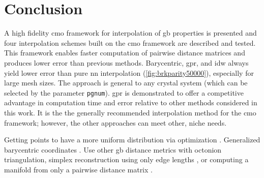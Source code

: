 \documentclass[preprint,12pt]{elsarticle}
\begin{document}
\begin{figure}
{    %
    }
    \label{fig:runtime}
\end{figure}

\section{Conclusion} \label{sec:conclusion}

A high fidelity \gls{cmo} framework for interpolation of \gls{gb} properties is presented and four interpolation schemes built on the \gls{cmo} framework are described and tested. This framework enables faster computation of pairwise distance matrices and produces lower error than previous methods.
Barycentric, \gls{gpr}, and \gls{idw} always yield lower error than pure \gls{nn} interpolation (\cref{fig:brkparity50000}), especially for large mesh sizes. The approach is general to any crystal system (which can be selected by the parameter \texttt{pgnum}). \Gls{gpr} is demonstrated to offer a competitive advantage in computation time and error relative to other methods considered in this work. It is the the generally recommended interpolation method for the \gls{cmo} framework; however, the other approaches can meet other, niche needs.
    

Getting points to have a more uniform distribution via optimization \cite{dolanBenchmarkingOptimizationSoftware2004,ConstrainedElectrostaticNonlinear2020}. Generalized barycentric coordinates \cite{floaterGeneralizedBarycentricCoordinates2015,meyerGeneralizedBarycentricCoordinates2002,langerSphericalBarycentricCoordinates2006}. Use other \gls{gb} distance metrics \cite{morawiecDistancesGrainInterfaces2019} with octonion triangulation, simplex reconstruction using only edge lengths \cite{connorHighdimensionalSimplexesSupermetric2017}, or computing a manifold from only a pairwise distance matrix \cite{boissonnatOnlyDistancesAre2017}. %
    
\end{document}
